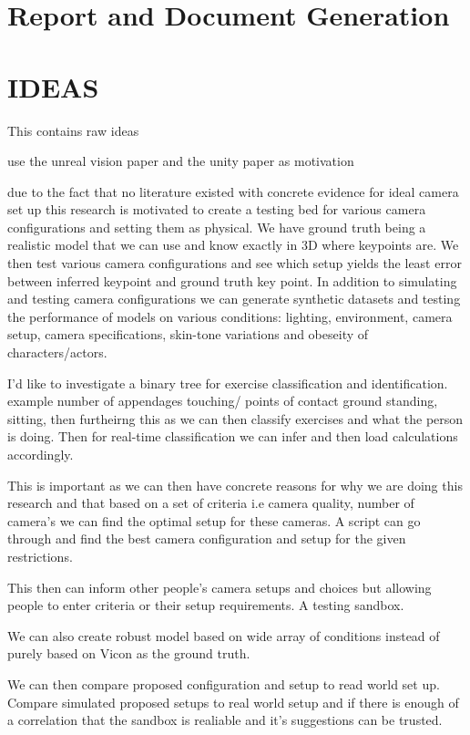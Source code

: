 \section{Report and Document Generation}    


\section{IDEAS}

This contains raw ideas

use the unreal vision paper and the unity paper as motivation

due to the fact that no literature existed with concrete evidence for ideal camera set up this research is motivated to create a testing bed for various camera configurations and setting them as physical. We have ground truth being a realistic model that we can use and know exactly in 3D where keypoints are. We then test various camera configurations and see which setup yields the least error between inferred keypoint and ground truth key point. In addition to simulating and testing camera configurations we can generate synthetic datasets and testing the performance of models on various conditions: lighting, environment, camera setup, camera specifications, skin-tone variations and obeseity of characters/actors.

I'd like to investigate a binary tree for exercise classification and identification.
example number of appendages touching/ points of contact ground standing, sitting, then furtheirng this as we can then classify exercises and what the person is doing. Then for real-time classification we can infer and then load calculations accordingly.

This is important as we can then have concrete reasons for why we are doing this research and that based on a set of criteria i.e camera quality, number of camera's we can find the optimal setup for these cameras. A script can go through and find the best camera configuration and setup for the given restrictions. 

This then can inform other people's camera setups and choices but allowing people to enter criteria or their setup requirements. A testing sandbox.

We can also create robust model based on wide array of conditions instead of purely based on Vicon as the ground truth. 

We can then compare proposed configuration and setup to read world set up. Compare simulated proposed setups to real world setup and if there is enough of a correlation that the sandbox is realiable and it's suggestions can be trusted.

